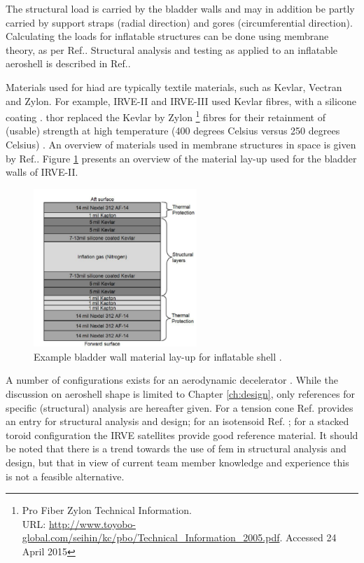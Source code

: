 The structural load is carried by the bladder walls and may in addition be partly carried by support straps (radial direction) and gores (circumferential direction). Calculating the loads for inflatable structures can be done using membrane theory, as per Ref.\cite{Young2002}. Structural analysis and testing as applied to an inflatable aeroshell is described in Ref.\cite{Lindell2006}.

Materials used for \gls{hiad} are typically textile materials, such as Kevlar, Vectran and Zylon. For example, IRVE-II and IRVE-III used Kevlar fibres, with a silicone coating \cite{Dillman2012a}. \gls{thor} replaced the Kevlar by Zylon \footnote{Pro Fiber Zylon Technical Information. \\ URL: \url{http://www.toyobo-global.com/seihin/kc/pbo/Technical\_Information\_2005.pdf}. Accessed 24 April 2015} fibres for their retainment of (usable) strength at high temperature (400 degrees Celsius versus 250 degrees Celsius) \cite{Dillman2014}. An overview of materials used in membrane structures in space is given by Ref.\cite{Jenkins2001}. Figure \ref{fig:matlayup} presents an overview of the material lay-up used for the bladder walls of IRVE-II.

\begin{figure}[H]
\centering
\includegraphics[width = 0.55\textwidth]{Figure/IRVE2_bladder_mat.PNG}
\caption[Example bladder wall material lay-up for inflatable shell]{Example bladder wall material lay-up for inflatable shell \cite[p.2]{Dillman2010}.}
\label{fig:matlayup}
\end{figure}

A number of configurations exists for an aerodynamic decelerator \cite{Smith2010}. While the discussion on aeroshell shape is limited to Chapter \ref{ch:design}, only references for specific (structural) analysis are hereafter given. For a tension cone Ref. \cite{Yamada2009} provides an entry for structural analysis and design; for an isotensoid Ref. \cite{Smith2011}; for a stacked toroid configuration the IRVE satellites provide good reference material. It should be noted that there is a trend towards the use of \gls{fem} in structural analysis and design, but that in view of current team member knowledge and experience this is not a feasible alternative.


